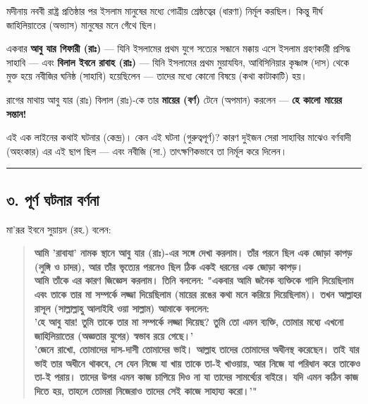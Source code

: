 মদীনায় নববী রাষ্ট্র প্রতিষ্ঠার পর ইসলাম মানুষের মধ্যে গোত্রীয় শ্রেষ্ঠত্বের  (ধারণা) নির্মূল করছিল। কিন্তু দীর্ঘ জাহিলিয়াতের  (অভ্যাস) মানুষের মনে গেঁথে ছিল।

একবার \textbf{আবু যার গিফারী (রাঃ)} — যিনি ইসলামের প্রথম যুগে সত্যের সন্ধানে মক্কায় এসে ইসলাম গ্রহণকারী প্রসিদ্ধ সাহাবি — এবং \textbf{বিলাল ইবনে রাবাহ (রাঃ)} — যিনি ইসলামের প্রথম মুয়াযযিন, আবিসিনিয়ার কৃষ্ণাঙ্গ  (দাস) থেকে মুক্ত হয়ে নবীজির ঘনিষ্ঠ  (সাহাবি) হয়েছিলেন — তাদের মধ্যে কোনো বিষয়ে  (কথা কাটাকাটি) হয়।

রাগের মাথায় আবু যার (রাঃ) বিলাল (রাঃ)-কে তার \textbf{মায়ের  (বর্ণ)} টেনে  (অপমান) করলেন — \textbf{হে কালো মায়ের সন্তান!}

এই এক লাইনের কথাই ঘটনার  (কেন্দ্র)। কেন এই ঘটনা  (গুরুত্বপূর্ণ)? কারণ দুইজন সেরা সাহাবির মাঝেও বর্ণবাদী  (অহংকার) এর এই ছাপ ছিল — এবং নবীজি (সা.) তাৎক্ষণিকভাবে তা নির্মূল করে দিলেন।

\medskip\hrule\medskip

\subsection*{৩. পূর্ণ ঘটনার বর্ণনা}

মা'রূর ইবনে সুয়ায়দ (রহ.) বলেন:

\begin{quote}
\textbf{আমি 'রাবাযা' নামক স্থানে আবু যার (রাঃ)-এর সঙ্গে দেখা করলাম। তাঁর পরনে ছিল এক জোড়া কাপড় (লুঙ্গি ও চাদর), আর তাঁর ভৃত্যের পরনেও ছিল ঠিক একই ধরনের এক জোড়া কাপড়।} \\
\textbf{আমি তাঁকে এর কারণ জিজ্ঞেস করলাম। তিনি বললেন: "একবার আমি জনৈক ব্যক্তিকে গালি দিয়েছিলাম এবং তাকে তার মা সম্পর্কে লজ্জা দিয়েছিলাম (মায়ের রঙের কথা মনে করিয়ে দিয়েছিলাম)। তখন আল্লাহর রাসূল (সাল্লাল্লাহু আলাইহি ওয়া সাল্লাম) আমাকে বললেন:} \\
\textbf{'হে আবু যার! তুমি তাকে তার মা সম্পর্কে লজ্জা দিয়েছ? তুমি তো এমন ব্যক্তি, তোমার মধ্যে এখনো জাহিলিয়াতের (অজ্ঞতার যুগের) স্বভাব রয়ে গেছে।'} \\
\textbf{'জেনে রাখো, তোমাদের দাস-দাসী তোমাদের ভাই। আল্লাহ তাদের তোমাদের অধীনস্থ করেছেন। তাই যার ভাই তার অধীনে থাকবে, সে যেন নিজে যা খায় তাকে তা-ই খাওয়ায়, আর নিজে যা পরিধান করে তাকেও তা-ই পরায়। তাদের উপর এমন কাজ চাপিয়ে দিও না যা তাদের সামর্থ্যের বাইরে। যদি এমন কঠিন কাজ দিতে হয়, তাহলে তোমরা নিজেরাও তাদের সেই কাজে সাহায্য করো।'"}
\end{quote}

